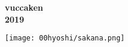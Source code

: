 \documentclass[10pt,b5paper,papersize,dvipdfmx]{jsbook}
\begin{document}
\clearpage\thispagestyle{empty}\mbox{}\newpage %
\ifodd\thepage %
  \thispagestyle{empty}\mbox{}\newpage
\fi

\thispagestyle{empty}
\quad

\vspace{70truemm}

\begin{center}
  \ttfamily\bfseries \fontsize{15}{0}\selectfont
  vuccaken
  \\ \vspace{1zw}
  2019
\end{center}

\vspace{5truemm}

\begin{center}
  \texttt{[image: 00hyoshi/sakana.png]}
\end{center}
\end{document}
